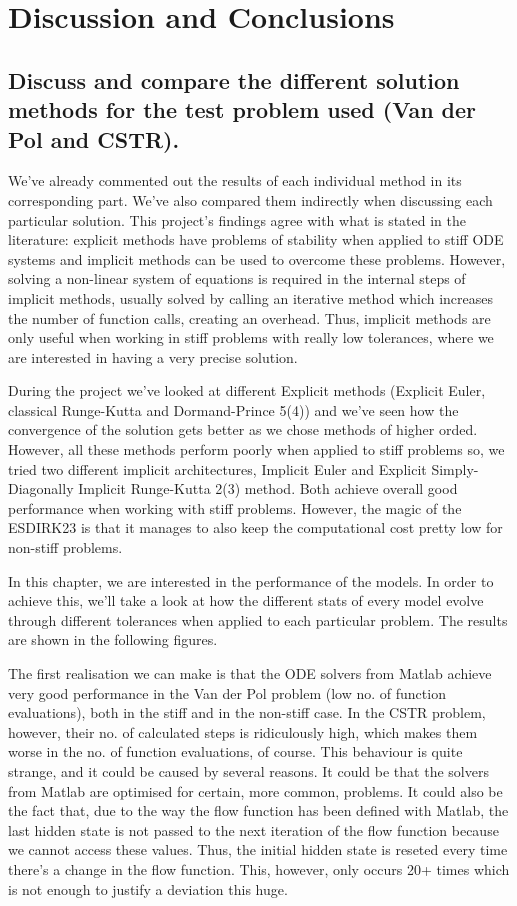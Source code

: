 \section{Discussion and Conclusions}

\subsection{Discuss and compare the different solution methods for the test problem used (Van der Pol and CSTR).}
We've already commented out the results of each individual method in its corresponding part. We've also compared them indirectly when discussing each particular solution. This project's findings agree with what is stated in the literature: explicit methods have problems of stability when applied to stiff ODE systems and implicit methods can be used to overcome these problems. However, solving a non-linear system of equations is required in the internal steps of implicit methods, usually solved by calling an iterative method which increases the number of function calls, creating an overhead. Thus, implicit methods are only useful when working in stiff problems with really low tolerances, where we are interested in having a very precise solution.

During the project we've looked at different Explicit methods (Explicit Euler, classical Runge-Kutta and Dormand-Prince 5(4)) and we've seen how the convergence of the solution gets better as we chose methods of higher orded. However, all these methods perform poorly when applied to stiff problems so, we tried two different implicit architectures, Implicit Euler and Explicit Simply-Diagonally Implicit Runge-Kutta 2(3) method. Both achieve overall good performance when working with stiff problems. However, the magic of the ESDIRK23 is that it manages to also keep the computational cost pretty low for non-stiff problems.

In this chapter, we are interested in the performance of the models. In order to achieve this, we'll take a look at how the different stats of every model evolve through different tolerances when applied to each particular problem. The results are shown in the following figures.

The first realisation we can make is that the ODE solvers from Matlab achieve very good performance in the Van der Pol problem (low no. of function evaluations), both in the stiff and in the non-stiff case. In the CSTR problem, however, their no. of calculated steps is ridiculously high, which makes them worse in the no. of function evaluations, of course. This behaviour is quite strange, and it could be caused by several reasons. It could be that the solvers from Matlab are optimised for certain, more common, problems. It could also be the fact that, due to the way the flow function has been defined with Matlab, the last hidden state is not passed to the next iteration of the flow function because we cannot access these values. Thus, the initial hidden state is reseted every time there's a change in the flow function. This, however, only occurs 20+ times which is not enough to justify a deviation this huge.

